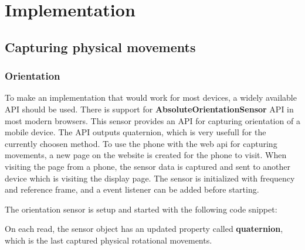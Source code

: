 \section{Implementation}

\subsection{Capturing physical movements}
\subsubsection{Orientation}
To make an implementation that would work for most devices, a widely available API should be used. There is support for \textbf{AbsoluteOrientationSensor} API in 
most modern browsers. This sensor provides an API for capturing orientation of a mobile device. The API outputs quaternion, which is very usefull for the currently choosen method.
To use the phone with the web api for capturing movements, a new page on the website is created for the phone to visit.
When visiting the page from a phone, the sensor data is captured and sent to another device which is visiting the display page.
The sensor is initialized with frequency and reference frame, and a event listener can be added before starting.

The orientation sensor is setup and started with the following code snippet:

On each read, the sensor object has an updated property called \textbf{quaternion}, which is the last captured physical rotational movements.

